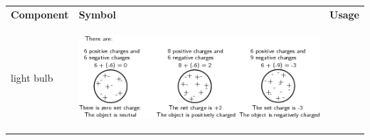         \begin{center}
      
      \label{m38771*uid12}
      
    \noindent
      \tablelasttail{}
      \begin{xtabular*}{\mytablewidth}[t]{|p{10\mystarwidth}|p{10\mystarwidth}|p{10\mystarwidth}|}\hline
    
    
        
                    \textbf{Component}
                   &
    
    
        
                    \textbf{Symbol}
                   &
    
    
        
                    \textbf{Usage}
     \tabularnewline{}
    
    
        light bulb &
    
    
        
                    
    \setcounter{subfigure}{0}

\label{m38771*id62893}
    \begin{center}
    \label{m38771*id62893!!!underscore!!!media}\label{m38771*id62893!!!underscore!!!printimage}\includegraphics{col11305.imgs/m38771_PG10C9_001.png} %
        

\end{center}
\end{xtabular*}
\end{center}
